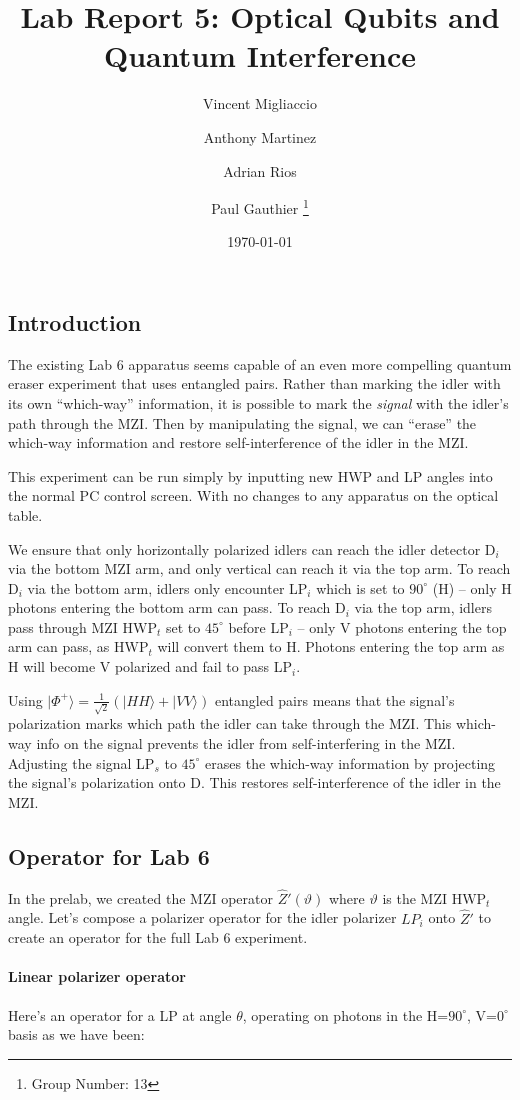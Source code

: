 \documentclass{article}
\title{Lab Report 5: Optical Qubits and Quantum Interference}
\author{
  Vincent Migliaccio \and
  Anthony Martinez \and
  Adrian Rios \and
  Paul Gauthier
  \thanks{Group Number: 13} \\
}
\date{\today}
\begin{document}
\pagestyle{empty}



\subsection*{Introduction}

The existing Lab 6 apparatus seems capable of an even more compelling quantum
eraser experiment that uses entangled pairs.
Rather than marking the idler with its own ``which-way'' information, it is possible
to mark the \emph{signal} with the idler's path through the MZI.
Then by manipulating the signal, we can ``erase'' the which-way information
and restore self-interference of the idler in the MZI.

This experiment can be run simply by inputting new HWP and LP angles
into the normal PC control screen.
With no changes to any apparatus on the optical table.

We ensure that only horizontally polarized idlers
can reach the idler detector D$_i$ via the bottom MZI arm,
and only vertical can reach it via the top arm.
To reach D$_i$ via the bottom arm, idlers only encounter
LP$_i$ which is set to $90^\circ$ (H) -- only
H photons entering the bottom arm can pass.
To reach D$_i$ via the top arm, idlers pass through
MZI HWP$_t$ set to $45^\circ$ before LP$_i$ -- only
V photons entering the top arm can pass, as HWP$_t$
will convert them to H.
Photons entering the top arm as H will become V polarized
and fail to pass LP$_i$.

Using $| \Phi^+ \rangle = \frac{1}{\sqrt2}(|HH\rangle + |VV\rangle)$
entangled pairs means that the signal's polarization marks which
path the idler can take through the MZI.
This which-way info on the signal
prevents the idler from self-interfering in the MZI.
Adjusting the signal LP$_s$ to $45^\circ$ erases the which-way information
by projecting the signal's polarization onto D.
This restores self-interference of the idler in the MZI.

\subsection*{Operator for Lab 6}

In the prelab, we created the MZI operator $\hat{Z}'(\vartheta)$
where $\vartheta$ is the MZI HWP$_t$ angle.
Let's compose a polarizer operator for the idler polarizer
$LP_i$ onto $\hat{Z}'$
to create an operator for the full Lab 6 experiment.

\paragraph{Linear polarizer operator}
Here's an operator for a LP at angle $\theta$,
operating on photons in the H=$90^\circ$, V=$0^\circ$ basis as we have been:
\end{document}

